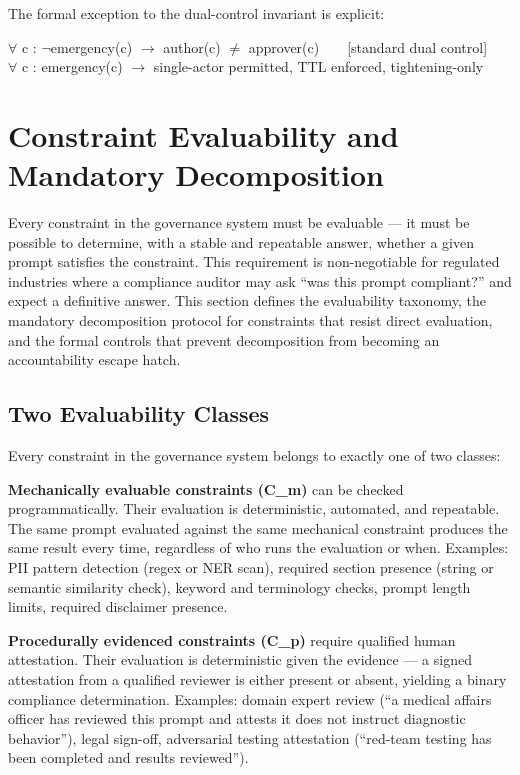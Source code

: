 The formal exception to the dual-control invariant is explicit:

\begin{claddisp}
$\forall$ c : $\neg$emergency(c) $\to$ author(c) $\neq$ approver(c)~~~~[standard dual control]\\
$\forall$ c : emergency(c) $\to$ single-actor permitted, TTL enforced, tightening-only
\end{claddisp}




\section{Constraint Evaluability and Mandatory Decomposition}
\label{sec:prompt-5}


Every constraint in the governance system must be evaluable --- it must be possible to determine, with a stable and repeatable answer, whether a given prompt satisfies the constraint. This requirement is non-negotiable for regulated industries where a compliance auditor may ask ``was this prompt compliant?'' and expect a definitive answer. This section defines the evaluability taxonomy, the mandatory decomposition protocol for constraints that resist direct evaluation, and the formal controls that prevent decomposition from becoming an accountability escape hatch.

\subsection{Two Evaluability Classes}


Every constraint in the governance system belongs to exactly one of two classes:

\textbf{Mechanically evaluable constraints (C\_\allowbreak{}m)} can be checked programmatically. Their evaluation is deterministic, automated, and repeatable. The same prompt evaluated against the same mechanical constraint produces the same result every time, regardless of who runs the evaluation or when. Examples: PII pattern detection (regex or NER scan), required section presence (string or semantic similarity check), keyword and terminology checks, prompt length limits, required disclaimer presence.

\textbf{Procedurally evidenced constraints (C\_\allowbreak{}p)} require qualified human attestation. Their evaluation is deterministic given the evidence --- a signed attestation from a qualified reviewer is either present or absent, yielding a binary compliance determination. Examples: domain expert review (``a medical affairs officer has reviewed this prompt and attests it does not instruct diagnostic behavior''), legal sign-off, adversarial testing attestation (``red-team testing has been completed and results reviewed'').


